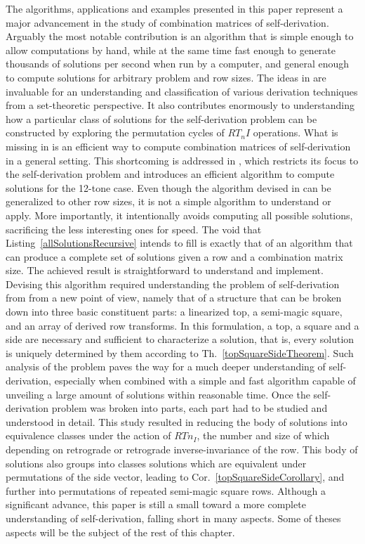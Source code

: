 The algorithms, applications and examples presented in this paper represent a major advancement in the study of combination matrices of self-derivation. Arguably the most notable contribution is an algorithm that is simple enough to allow computations by hand, while at the same time fast enough to generate thousands of solutions per second when run by a computer, and general enough to compute solutions for arbitrary problem and row sizes. The ideas in \cite{Starr1984} are invaluable for an understanding and classification of various derivation techniques from a set-theoretic perspective. It also contributes enormously to understanding how a particular class of solutions for the self-derivation problem can be constructed by exploring the permutation cycles of $RT_nI$ operations. What is missing in \cite{Starr1984} is an efficient way to compute combination matrices of self-derivation in a general setting. This shortcoming is addressed in \cite{Kowalski1987b}, which restricts its focus to the self-derivation problem and introduces an efficient algorithm to compute solutions for the 12-tone case. Even though the algorithm devised in \cite{Kowalski1987b} can be generalized to other row sizes, it is not a simple algorithm to understand or apply. More importantly, it intentionally avoids computing all possible solutions, sacrificing the less interesting ones for speed. The void that Listing~\ref{allSolutionsRecursive} intends to fill is exactly that of an algorithm that can produce a complete set of solutions given a row and a combination matrix size. The achieved result is straightforward to understand and implement. Devising this algorithm required understanding the problem of self-derivation from from a new point of view, namely that of a structure that can be broken down into three basic constituent parts: a linearized top, a semi-magic square, and an array of derived row transforms. In this formulation, a top, a square and a side are necessary and sufficient to characterize a solution, that is, every solution is uniquely determined by them according to Th.~\ref{topSquareSideTheorem}. Such analysis of the problem paves the way for a much deeper understanding of self-derivation, especially when combined with a simple and fast algorithm capable of unveiling a large amount of solutions within reasonable time. Once the self-derivation problem was broken into parts, each part had to be studied and understood in detail. This study resulted in reducing the body of solutions into equivalence classes under the action of $RTn_I$, the number and size of which depending on retrograde or retrograde inverse-invariance of the row. This body of solutions also groups into classes solutions which are equivalent under permutations of the side vector, leading to Cor.~\ref{topSquareSideCorollary}, and further into permutations of repeated semi-magic square rows. Although a significant advance, this paper is still a small toward a more complete understanding of self-derivation, falling short in many aspects. Some of theses aspects will be the subject of the rest of this chapter.

